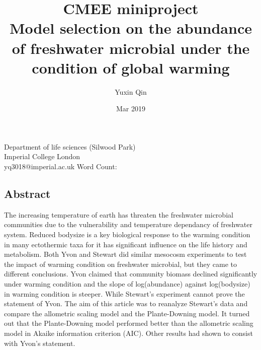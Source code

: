 \documentclass[11pt]{article}
\title{
CMEE miniproject \\
\textbf{ Model selection on the abundance of freshwater microbial under the condition of global warming}}
\author{Yuxin Qin }
\date{Mar 2019}
\begin{document}
\maketitle

\begin{center}
Department of life sciences (Silwood Park)\\
Imperial College London  \\
\bigbreak
yq3018@imperial.ac.uk
\bigbreak
\bigbreak
\bigbreak
\bigbreak
\bigbreak
\bigbreak
Word Count:
\end{center}

\newpage

\begin{linenumbers}
\section*{Abstract}
The increasing temperature of earth has threaten the freshwater microbial communities due to the vulnerability and temperature dependancy of freshwater system. Reduced bodysize is a key biological response to the warming condition in many ectothermic taxa for it has significant influence on the life history and metabolism. Both Yvon and Stewart did similar mesocosm experiments to test the impact of warming condition on freshwater microbial, but they came to different conclusions. Yvon claimed that community biomass declined significantly under warming condition and the slope of log(abundance) against log(bodysize) in warming condition is steeper. While Stewart's experiment cannot prove the statement of Yvon.
The aim of this article was to reanalyze Stewart's data and compare the allometric scaling model and the Plante-Downing model. It turned out that the Plante-Downing model performed better than the allometric scaling model in Akaike information criterion (AIC). Other results had shown to consist with Yvon's statement.




\end{linenumbers}
\end{document}
